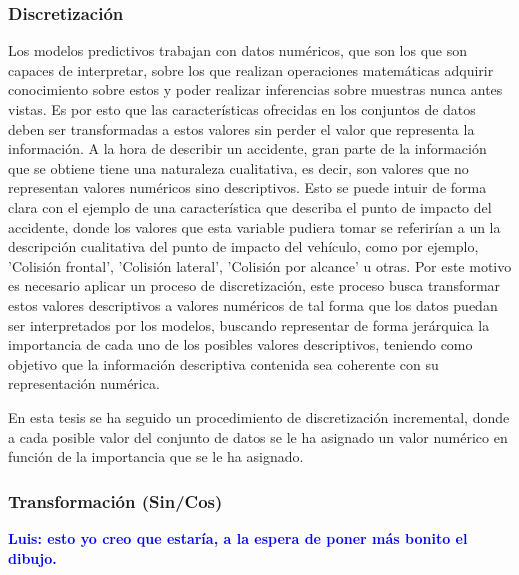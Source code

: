 \documentclass{uathesis-es}
\begin{document}
{	\subsubsection{Discretización}
	
	
	Los modelos predictivos trabajan con datos numéricos, que son los que son capaces de interpretar, sobre los que realizan operaciones matemáticas adquirir conocimiento sobre estos y poder realizar inferencias sobre muestras nunca antes vistas. Es por esto que las características ofrecidas en los conjuntos de datos deben ser transformadas a estos valores sin perder el valor que representa la información. A la hora de describir un accidente, gran parte de la información que se obtiene tiene una naturaleza cualitativa, es decir, son valores que no representan valores numéricos sino descriptivos. Esto se puede intuir de forma clara con el ejemplo de una característica que describa el punto de impacto del accidente, donde los valores que esta variable pudiera tomar se referirían a un la descripción cualitativa del punto de impacto del vehículo, como por ejemplo,  'Colisión frontal', 'Colisión lateral', 'Colisión por alcance' u otras. Por este motivo es necesario aplicar un proceso de discretización, este proceso busca transformar estos valores descriptivos a valores numéricos de tal forma que los datos puedan ser interpretados por los modelos, buscando representar de forma jerárquica la importancia de cada uno de los posibles valores descriptivos, teniendo como objetivo que la información descriptiva contenida sea coherente con su representación numérica.
	
	
	En esta tesis se ha seguido un procedimiento de discretización incremental, donde a cada posible valor del conjunto de datos se le ha asignado un valor numérico en función de la importancia que se le ha asignado.
	
	\subsubsection{Transformación (Sin/Cos)}
	
	\textcolor{blue}{\textbf{Luis: esto yo creo que estaría, a la espera de poner más bonito el dibujo.}}\\
	
}
\end{document}

